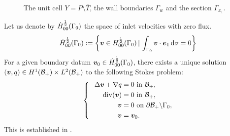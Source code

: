 \documentclass[a4paper,10pt,reqno]{amsart}
\begin{document}
\begin{figure}
    \centering  
    \caption{The unit cell $Y=P\setminus \bar T$, the wall boundaries $\Gamma_w$ and the
    section $\Gamma_{x_1}$.}
    \label{fig:1e8x0}
\end{figure}
Let us denote by $\dot{H}^{\frac{1}{2}}_{00}(\Gamma_0)$ the space   of inlet
velocities with zero flux.
\[
\dot{H}^{\frac{1}{2}}_{00}(\Gamma_0):=\left\{ {\bm v}\in H^{\frac{1}{2}}_{00}(\Gamma_0)\, | \,
\int_{\Gamma_0}{\bm v}\cdot{\bm e}_1\,\mathrm{d} \sigma =0\right\}
\] 
For a given boundary datum ${\bm v}_0\in \dot{H}^{\frac{1}{2}}_{00}(\Gamma_0) $, there exists a unique solution $({\bm v},q)\in
H^{1}(\mathcal{B}_+)\times L^{2}(\mathcal{B}_+)$ to the
following Stokes problem:  
\begin{equation}
\label{eqn:235q7}
\left\{\begin{aligned}
        -\Delta {\bm v}+\nabla q& = 0\textrm{ in } \mathcal{B}_+,\\    
        \mathrm{div}({\bm v}) &= 0 \textrm{ in } \mathcal{B}_+,\\  
        {\bm v}& = 0 \textrm{ on } \partial \mathcal{B}_+\backslash \Gamma_0,\\    
        {\bm v} &= {\bm v}_0.
\end{aligned}
\right.
\end{equation}
This is established in \cite{nazarov_navier-stokes_2000-1,feppon_asymptotic_2024}.  
    
\end{document}
